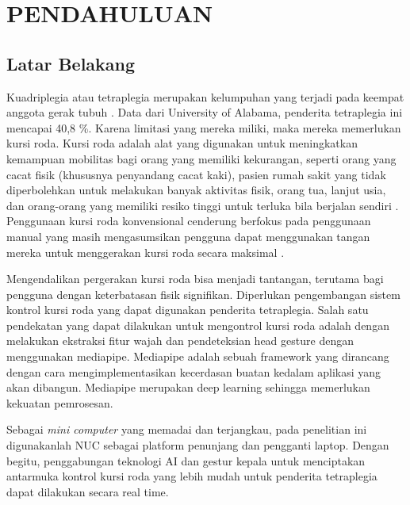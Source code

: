 \chapter{PENDAHULUAN}
\label{chap:pendahuluan}


\section{Latar Belakang}
\label{sec:latarbelakang}
Kuadriplegia atau tetraplegia merupakan kelumpuhan yang terjadi pada keempat anggota gerak tubuh \parencite{Ropper2014Adams}. Data dari University of Alabama, penderita tetraplegia ini mencapai 40,8 \%. Karena limitasi yang mereka miliki, maka mereka memerlukan kursi roda. Kursi roda adalah alat yang digunakan untuk meningkatkan kemampuan mobilitas bagi orang yang memiliki kekurangan, seperti orang yang cacat fisik (khususnya penyandang cacat kaki), pasien rumah sakit yang tidak diperbolehkan untuk melakukan banyak aktivitas fisik, orang tua, lanjut usia, dan orang-orang yang memiliki resiko tinggi untuk terluka bila berjalan sendiri \parencite{Ady2011}. Penggunaan kursi roda konvensional cenderung berfokus pada penggunaan manual yang masih mengasumsikan pengguna dapat menggunakan tangan mereka untuk menggerakan kursi roda secara maksimal \parencite{sumit2017}.

Mengendalikan pergerakan kursi roda bisa menjadi tantangan, terutama bagi pengguna dengan keterbatasan fisik signifikan. Diperlukan pengembangan sistem kontrol kursi roda yang dapat digunakan penderita tetraplegia. Salah satu pendekatan yang dapat dilakukan untuk mengontrol kursi roda adalah dengan melakukan ekstraksi fitur wajah dan pendeteksian head gesture dengan menggunakan mediapipe. Mediapipe adalah sebuah framework yang dirancang dengan cara mengimplementasikan kecerdasan buatan kedalam aplikasi yang akan dibangun\parencite{Budimananjay}. Mediapipe merupakan deep learning sehingga memerlukan kekuatan pemrosesan.

Sebagai \emph{mini computer} yang memadai dan terjangkau, pada penelitian ini digunakanlah NUC sebagai platform penunjang dan pengganti laptop. Dengan begitu, penggabungan teknologi AI dan gestur kepala untuk menciptakan antarmuka kontrol kursi roda yang lebih mudah untuk penderita tetraplegia dapat dilakukan secara real time.


